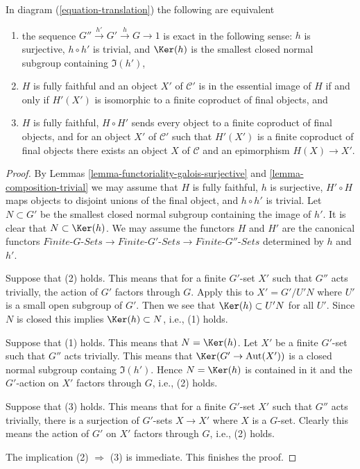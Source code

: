 \begin{lemma}
\label{lemma-functoriality-galois-ses}
In diagram (\ref{equation-translation}) the following are equivalent
\begin{enumerate}
\item the sequence $G'' \xrightarrow{h'} G' \xrightarrow{h} G \to 1$
is exact in the following sense: $h$ is surjective, $h \circ h'$ is trivial,
and $\Ker(h)$ is the smallest closed normal subgroup containing $\Im(h')$,
\item $H$ is fully faithful and an object $X'$ of $\mathcal{C}'$ is in
the essential image of $H$ if and only if $H'(X')$ is isomorphic to a
finite coproduct of final objects, and
\item $H$ is fully faithful, $H \circ H'$ sends every object to a finite
coproduct of final objects, and for an object $X'$ of $\mathcal{C}'$
such that $H'(X')$ is a finite coproduct of final objects there exists
an object $X$ of $\mathcal{C}$ and an epimorphism $H(X) \to X'$.
\end{enumerate}
\end{lemma}

\begin{proof}
By Lemmas \ref{lemma-functoriality-galois-surjective} and
\ref{lemma-composition-trivial} we may assume that
$H$ is fully faithful, $h$ is surjective, $H' \circ H$ maps
objects to disjoint unions of the final object, and $h \circ h'$
is trivial. Let $N \subset G'$ be the smallest closed normal
subgroup containing the image of $h'$. It is clear that
$N \subset \Ker(h)$.
We may assume the functors $H$ and $H'$ are the canonical functors
$\textit{Finite-}G\textit{-Sets} \to \textit{Finite-}G'\textit{-Sets}
\to \textit{Finite-}G''\textit{-Sets}$ determined by $h$ and $h'$.

\medskip\noindent
Suppose that (2) holds. This means that for a finite $G'$-set $X'$
such that $G''$ acts trivially, the action of $G'$ factors through $G$.
Apply this to $X' = G'/U'N$ where $U'$ is a small open subgroup of $G'$.
Then we see that $\Ker(h) \subset U'N$ for all $U'$. Since $N$ is closed
this implies $\Ker(h) \subset N$, i.e., (1) holds.

\medskip\noindent
Suppose that (1) holds. This means that $N = \Ker(h)$. Let $X'$ be a
finite $G'$-set such that $G''$ acts trivially. This means that
$\Ker(G' \to \text{Aut}(X'))$ is a closed normal subgroup containg
$\Im(h')$. Hence $N = \Ker(h)$ is contained in it and the $G'$-action
on $X'$ factors through $G$, i.e., (2) holds.

\medskip\noindent
Suppose that (3) holds. This means that for a finite $G'$-set $X'$
such that $G''$ acts trivially, there is a surjection of $G'$-sets
$X \to X'$ where $X$ is a $G$-set. Clearly this means the action of
$G'$ on $X'$ factors through $G$, i.e., (2) holds.

\medskip\noindent
The implication (2) $\Rightarrow$ (3) is immediate. This finishes the proof.
\end{proof}

